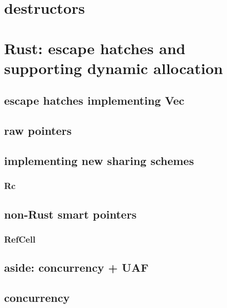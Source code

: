 \section{destructors}


\section{Rust: escape hatches and supporting dynamic allocation}


\subsection{escape hatches implementing Vec}


\subsection{raw pointers}



\subsection{implementing new sharing schemes}
\subsubsection{Rc}


\subsection{non-Rust smart pointers}


\subsubsection{RefCell}


\subsection{aside: concurrency + UAF}


\subsection{concurrency}


